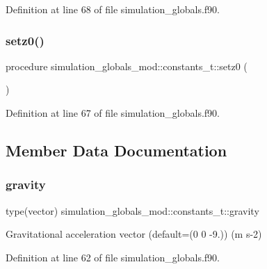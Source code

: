 Definition at line 68 of file simulation\+\_\+globals.\+f90.

\mbox{\label{structsimulation__globals__mod_1_1constants__t_a0ad20f9a9b8c4fd0a6813415e690353a}} 
\subsubsection{\texorpdfstring{setz0()}{setz0()}}
{\footnotesize\ttfamily procedure simulation\+\_\+globals\+\_\+mod\+::constants\+\_\+t\+::setz0 (\begin{DoxyParamCaption}{ }\end{DoxyParamCaption})\hspace{0.3cm}{\ttfamily [private]}}



Definition at line 67 of file simulation\+\_\+globals.\+f90.



\subsection{Member Data Documentation}
\mbox{\label{structsimulation__globals__mod_1_1constants__t_ab1d29ee73044e2bb7b47ca302e2cfdf9}} 
\subsubsection{\texorpdfstring{gravity}{gravity}}
{\footnotesize\ttfamily type(vector) simulation\+\_\+globals\+\_\+mod\+::constants\+\_\+t\+::gravity\hspace{0.3cm}{\ttfamily [private]}}



Gravitational acceleration vector (default=(0 0 -\/9.)) (m s-\/2) 



Definition at line 62 of file simulation\+\_\+globals.\+f90.



